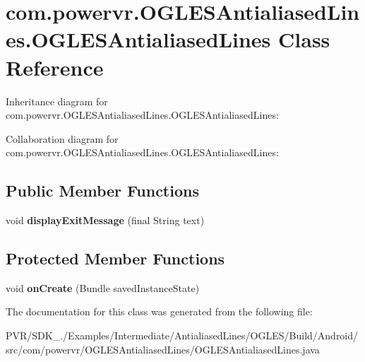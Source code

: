 \hypertarget{classcom_1_1powervr_1_1_o_g_l_e_s_antialiased_lines_1_1_o_g_l_e_s_antialiased_lines}{\section{com.\+powervr.\+O\+G\+L\+E\+S\+Antialiased\+Lines.\+O\+G\+L\+E\+S\+Antialiased\+Lines Class Reference}
\label{classcom_1_1powervr_1_1_o_g_l_e_s_antialiased_lines_1_1_o_g_l_e_s_antialiased_lines}
}


Inheritance diagram for com.\+powervr.\+O\+G\+L\+E\+S\+Antialiased\+Lines.\+O\+G\+L\+E\+S\+Antialiased\+Lines\+:


Collaboration diagram for com.\+powervr.\+O\+G\+L\+E\+S\+Antialiased\+Lines.\+O\+G\+L\+E\+S\+Antialiased\+Lines\+:
\subsection*{Public Member Functions}
\begin{DoxyCompactItemize}
\item 
\hypertarget{classcom_1_1powervr_1_1_o_g_l_e_s_antialiased_lines_1_1_o_g_l_e_s_antialiased_lines_a7b5b2e716f17b20725234654e9b5ac4e}{void {\bfseries display\+Exit\+Message} (final String text)}\label{classcom_1_1powervr_1_1_o_g_l_e_s_antialiased_lines_1_1_o_g_l_e_s_antialiased_lines_a7b5b2e716f17b20725234654e9b5ac4e}

\end{DoxyCompactItemize}
\subsection*{Protected Member Functions}
\begin{DoxyCompactItemize}
\item 
\hypertarget{classcom_1_1powervr_1_1_o_g_l_e_s_antialiased_lines_1_1_o_g_l_e_s_antialiased_lines_a779ba7c8a996fee9774d58a43f728dfe}{void {\bfseries on\+Create} (Bundle saved\+Instance\+State)}\label{classcom_1_1powervr_1_1_o_g_l_e_s_antialiased_lines_1_1_o_g_l_e_s_antialiased_lines_a779ba7c8a996fee9774d58a43f728dfe}

\end{DoxyCompactItemize}


The documentation for this class was generated from the following file\+:\begin{DoxyCompactItemize}
\item 
P\+V\+R/\+S\+D\+K\+\_./\+Examples/\+Intermediate/\+Antialiased\+Lines/\+O\+G\+L\+E\+S/\+Build/\+Android/src/com/powervr/\+O\+G\+L\+E\+S\+Antialiased\+Lines/O\+G\+L\+E\+S\+Antialiased\+Lines.\+java\end{DoxyCompactItemize}
